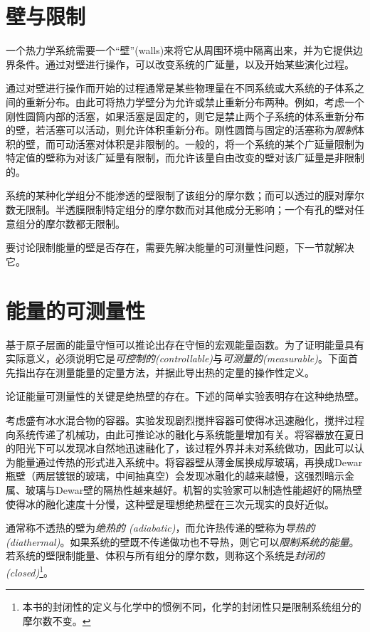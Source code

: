 \section{壁与限制}
\label{sec1.6}
一个热力学系统需要一个“壁”(walls)来将它从周围环境中隔离出来，并为它提供边界条件。通过对壁进行操作，可以改变系统的广延量，以及开始某些演化过程。

通过对壁进行操作而开始的过程通常是某些物理量在不同系统或大系统的子体系之间的重新分布。由此可将热力学壁分为允许或禁止重新分布两种。例如，考虑一个刚性圆筒内部的活塞，如果活塞是固定的，则它是禁止两个子系统的体系重新分布的壁，若活塞可以活动，则允许体积重新分布。刚性圆筒与固定的活塞称为{\it 限制}体积的壁，而可动活塞对体积是非限制的。一般的，将一个系统的某个广延量限制为特定值的壁称为对该广延量有限制，而允许该量自由改变的壁对该广延量是非限制的。

系统的某种化学组分不能渗透的壁限制了该组分的摩尔数；而可以透过的膜对摩尔数无限制。半透膜限制特定组分的摩尔数而对其他成分无影响；一个有孔的壁对任意组分的摩尔数都无限制。

要讨论限制能量的壁是否存在，需要先解决能量的可测量性问题，下一节就解决它。

\section{能量的可测量性}
\label{sec1.7}
基于原子层面的能量守恒可以推论出存在守恒的宏观能量函数。为了证明能量具有实际意义，必须说明它是{\it 可控制的(controllable)}与{\it 可测量的(measurable)}。下面首先指出存在测量能量的定量方法，并据此导出热的定量的操作性定义。

论证能量可测量性的关键是绝热壁的存在。下述的简单实验表明存在这种绝热壁。

考虑盛有冰水混合物的容器。实验发现剧烈搅拌容器可使得冰迅速融化，搅拌过程向系统传递了机械功，由此可推论冰的融化与系统能量增加有关。将容器放在夏日的阳光下可以发现冰自然地迅速融化了，该过程外界并未对系统做功，因此可以认为能量通过传热的形式进入系统中。将容器壁从薄金属换成厚玻璃，再换成Dewar瓶壁（两层镀银的玻璃，中间抽真空）会发现冰融化的越来越慢，这强烈暗示金属、玻璃与Dewar壁的隔热性越来越好。机智的实验家可以制造性能超好的隔热壁使得冰的融化速度十分慢，这种壁是理想绝热壁在三次元现实的良好近似。

通常称不透热的壁为{\it 绝热的 (adiabatic)}，而允许热传递的壁称为{\it 导热的 (diathermal)}。如果系统的壁既不传递做功也不导热，则它可以{\it 限制系统的能量}。若系统的壁限制能量、体积与所有组分的摩尔数，则称这个系统是{\it 封闭的 (closed)}\footnote{本书的封闭性的定义与化学中的惯例不同，化学的封闭性只是限制系统组分的摩尔数不变。}。

